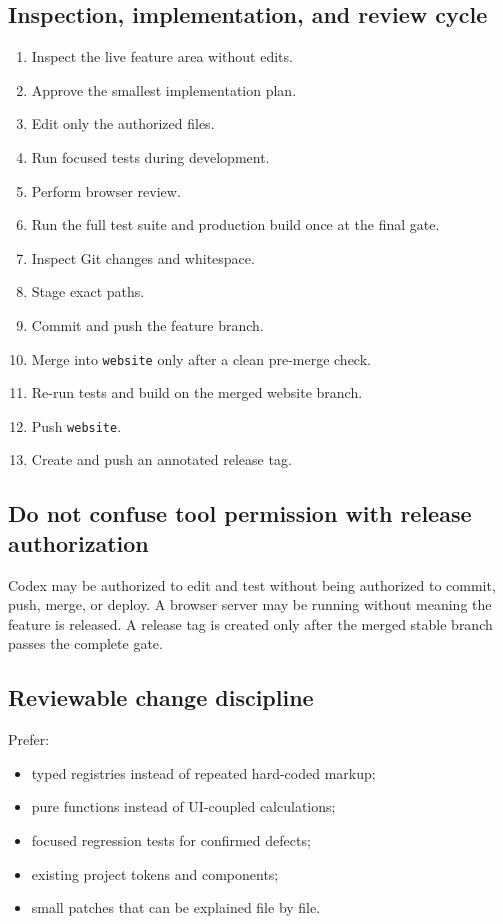 \documentclass[11pt,letterpaper]{article}
\newcommand{\branchname}[1]{\texttt{#1}}
\begin{document}
\subsection{Inspection, implementation, and review cycle}

\begin{enumerate}
    \item Inspect the live feature area without edits.
    \item Approve the smallest implementation plan.
    \item Edit only the authorized files.
    \item Run focused tests during development.
    \item Perform browser review.
    \item Run the full test suite and production build once at the final gate.
    \item Inspect Git changes and whitespace.
    \item Stage exact paths.
    \item Commit and push the feature branch.
    \item Merge into \branchname{website} only after a clean pre-merge check.
    \item Re-run tests and build on the merged website branch.
    \item Push \branchname{website}.
    \item Create and push an annotated release tag.
\end{enumerate}

\subsection{Do not confuse tool permission with release authorization}

Codex may be authorized to edit and test without being authorized to commit,
push, merge, or deploy. A browser server may be running without meaning the
feature is released. A release tag is created only after the merged stable
branch passes the complete gate.

\subsection{Reviewable change discipline}

Prefer:

\begin{itemize}
    \item typed registries instead of repeated hard-coded markup;
    \item pure functions instead of UI-coupled calculations;
    \item focused regression tests for confirmed defects;
    \item existing project tokens and components;
    \item small patches that can be explained file by file.
\end{itemize}
\end{document}
